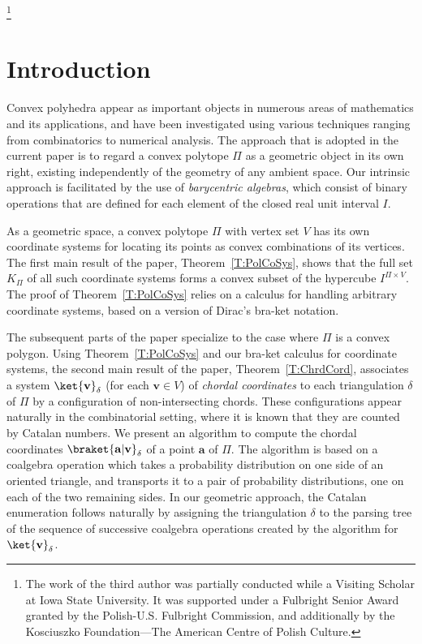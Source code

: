 \documentclass[12pt]{amsart}
\theoremstyle{plain}
\theoremstyle{definition}
\numberwithin{equation}{section}
\begin{document}
\thanks{The work of the third author was partially conducted while a Visiting Scholar at Iowa State University. It was supported under a Fulbright Senior Award granted by the Polish-U.S. Fulbright Commission, and additionally by the Kosciuszko Foundation---The American Centre of Polish Culture.}



\maketitle

\tableofcontents


\section{Introduction}


Convex polyhedra appear as important objects in numerous areas of mathematics and its applications, and have been investigated using various techniques ranging from combinatorics to numerical analysis. The approach that is adopted in the current paper is to regard a convex polytope $\Pi$ as a geometric object in its own right, existing independently of the geometry of any ambient space. Our intrinsic approach is facilitated by the use of \emph{barycentric algebras}, which consist of binary operations that are defined for each element of the closed real unit interval $I$.

As a geometric space, a convex polytope $\Pi$ with vertex set $V$ has its own coordinate systems for locating its points as convex combinations of its vertices. The first main result of the paper, Theorem~\ref{T:PolCoSys}, shows that the full set $K_\Pi$ of all such coordinate systems forms a convex subset of the hypercube $I^{\Pi\times V}$. The proof of Theorem~\ref{T:PolCoSys} relies on a calculus for handling arbitrary coordinate systems, based on a version of Dirac's bra-ket notation.

The subsequent parts of the paper specialize to the case where $\Pi$ is a convex polygon. Using Theorem~\ref{T:PolCoSys} and our bra-ket calculus for coordinate systems, the second main result of the paper, Theorem~\ref{T:ChrdCord}, associates a system $\ket{\mathbf v}_\delta$ (for each $\mathbf v\in V$) of \emph{chordal coordinates} to each triangulation $\delta$ of $\Pi$ by a configuration of non-intersecting chords. These configurations appear naturally in the combinatorial setting, where it is known that they are counted by Catalan numbers. We present an algorithm to compute the chordal coordinates $\braket{\mathbf a|\mathbf v}_\delta$ of a point $\mathbf a$ of $\Pi$. The algorithm is based on a coalgebra operation which takes a probability distribution on one side of an oriented triangle, and transports it to a pair of probability distributions, one on each of the two remaining sides.  In our geometric approach, the Catalan enumeration follows naturally by assigning the triangulation $\delta$ to the parsing tree of the sequence of successive coalgebra operations created by the algorithm for $\ket{\mathbf v}_\delta$.
\end{document}
